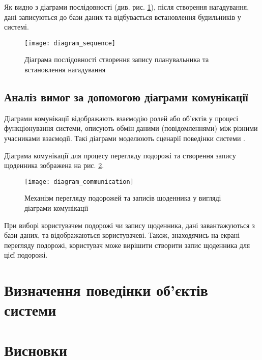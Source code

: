 \documentclass[../main.tex]{subfiles}
\begin{document}
Як видно з діаграми послідовності (див. рис. \ref{diagram:sequence}), після створення нагадування, дані записуються до бази даних та відбувається встановлення будильників у системі. 

\begin{figure}[H]
	\centering
	\texttt{[image: diagram\_sequence]}
	\caption{Діаграма послідовності створення запису планувальника та встановлення нагадування}
	\label{diagram:sequence}
\end{figure}

\subsection{Аналіз вимог за допомогою діаграми комунікації}
Діаграми комунікації відображають взаємодію ролей або об'єктів у процесі функціонування системи, описують обмін даними (повідомленнями) між різними учасниками взаємодії. Такі діаграми моделюють сценарії поведінки системи \cite{diploma_guidelines}. 

Діаграма комунікації для процесу перегляду подорожі та створення запису щоденника зображена на рис. \ref{diagram:communication}.

\begin{figure}[H]
	\centering
	\texttt{[image: diagram\_communication]}
	\caption{Механізм перегляду подорожей та записів щоденника у вигляді діаграми комунікації}
	\label{diagram:communication}
\end{figure}

При виборі користувачем подорожі чи запису щоденника, дані завантажуються з бази даних, та відображаються користувачеві. Також, знаходячись на екрані перегляду подорожі, користувач може вирішити створити запис щоденника для цієї подорожі.

\section{Визначення поведінки об'єктів системи}


\section{Висновки}

\end{document}
